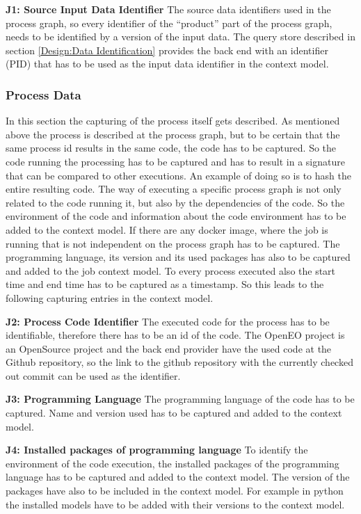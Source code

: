 \documentclass[draft,final]{vutinfth} %
\begin{document}
\textbf{J1:  Source Input Data Identifier}
The source data identifiers used in the process graph, so every identifier of the “product” part of the process graph, needs to be identified by a version of the input data. The query store described in section \ref{Design:Data Identification} provides the back end with an identifier (PID) that has to be used as the input data identifier in the context model.


\subsubsection{Process Data}\label{Job:Process Data}
In this section the capturing of the process itself gets described. As mentioned above the process is described at the process graph, but to be certain that the same process id results in the same code, the code has to be captured. So the code running the processing has to be captured and has to result in a signature that can be compared to other executions. An example of doing so is to hash the entire resulting code. 
The way of executing a specific process graph is not only related to the code running it, but also by the dependencies of the code. So the environment of the code and information about the code environment has to be added to the context model. If there are any docker image, where the job is running that is not independent on the process graph has to be captured. The programming language, its version and its used packages has also to be captured and added to the job context model. To every process executed also the start time and end time has to be captured as a timestamp. So this leads to the following capturing entries in the context model.

\textbf{J2: Process Code Identifier}
The executed  code for the process has to be identifiable, therefore there has to be an id of the code. The OpenEO project is an OpenSource project and the back end provider have the used code at the Github repository, so the link to the github repository with the currently checked out commit can be used as the identifier. 

\textbf{J3: Programming Language}
The programming language of the code has to be captured. Name and version used has to be captured and added to the context model.

\textbf{J4: Installed packages of programming language}
To identify the environment of the code execution, the installed packages of the programming language has to be captured and added to the context model. The version of the packages have also to be included in the context model. For example in python the installed models have to be added with their versions to the context model.
\end{document}
